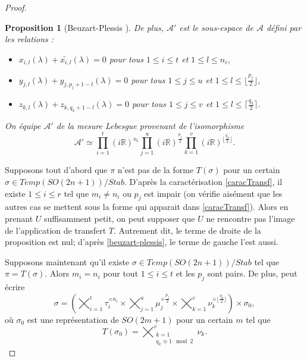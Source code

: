 \documentclass{amsart}
\newtheorem{proposition}{Proposition}[section]
\begin{document}
\begin{proof}
\begin{proposition}[Beuzart-Plessis \cite{beuzart-plessis}]
De plus, $\mathcal{A}'$ est le sous-espace de $\mathcal{A}$ défini par les relations :
\begin{itemize}
\item $x_{i,l}(\lambda) + \widetilde{x_{i,l}}(\lambda) = 0$ pour tous $1 \leq i \leq t$ et $1 \leq l \leq n_i$,
\item $y_{j,l}(\lambda) + y_{j,p_j+1-l}(\lambda) = 0$ pour tous $1 \leq j \leq u$ et $1 \leq l \leq \lfloor \frac{p_j}{2} \rfloor$,
\item $z_{k,l}(\lambda) + z_{k,q_k+1-l}(\lambda) = 0$ pour tous $1 \leq j \leq v$ et $1 \leq l \leq \lceil \frac{q_k}{2} \rceil$.
\end{itemize}
On équipe $\mathcal{A}'$ de la mesure Lebesgue provenant de l'isomorphisme
\begin{equation}
\mathcal{A}' \simeq \prod_{i=1}^t (i\mathbb{R})^{n_i} \prod_{j=1}^u (i\mathbb{R})^{\frac{p_j}{2}} \prod_{k=1}^v (i\mathbb{R})^{\lfloor \frac{q_k}{2} \rfloor}.
\end{equation}
\end{proposition}

Supposons tout d'abord que $\pi$ n'est pas de la forme $T(\sigma)$ pour un certain $\sigma \in Temp(SO(2n+1))/Stab$. D'après la caractérisation \ref{caracTransf}, il existe $1 \leq i \leq r$ tel que $m_i \neq n_i$ ou $p_j$ est impair (on vérifie aisément que les autres cas se mettent sous la forme qui apparait dans \ref{caracTransf}). Alors en prenant $U$ suffisamment petit, on peut supposer que $U$ ne rencontre pas l'image de l'application de transfert $T$. Autrement dit, le terme de droite de la proposition est nul; d'après \ref{beuzart-plessis}, le terme de gauche l'est aussi.

Supposons maintenant qu'il existe $\sigma \in Temp(SO(2n+1))/Stab$ tel que $\pi = T(\sigma)$. Alors $m_i = n_i$ pour tout $1 \leq i \leq t$ et les $p_j$ sont pairs. De plus,
peut écrire
\begin{equation}
\sigma = \left( \bigtimes_{i=1}^t \tau_i^{\times n_i} \times \bigtimes_{j=1}^u \mu_j^{\times \frac{p_j}{2}} \times \bigtimes_{k=1}^v \nu_k^{\times \lfloor \frac{q_k}{2}\rfloor} \right) \times \sigma_0,
\end{equation}
où $\sigma_0$ est une représentation de $SO(2m+1)$ pour un certain $m$ tel que
\begin{equation}
\label{sigma0}
T(\sigma_0) = \bigtimes_{\substack{k=1 \\ q_k \equiv 1 \mod 2}}^v \nu_k.
\end{equation}


\end{proof}
\end{document}
